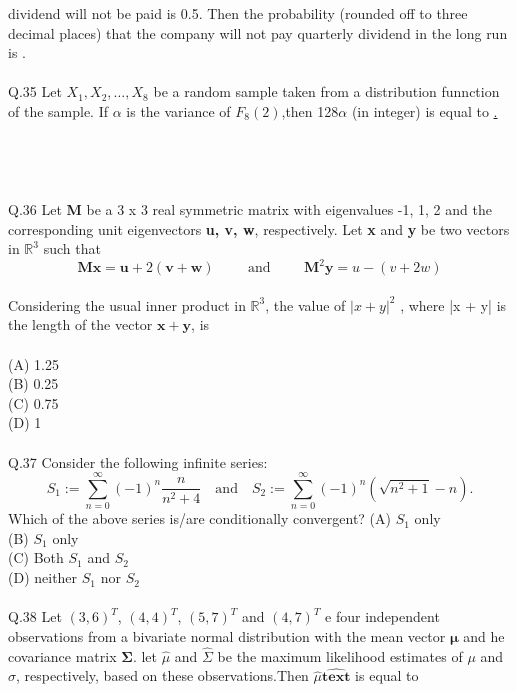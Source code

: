 \documentclass{book}[200pt]
\begin{document}
{dividend will not be paid is 0.5. Then the probability (rounded off to three
decimal places) that the company will not pay quarterly dividend in the long run is \underline{\hspace{2cm}}.\\
\\
Q.35 Let $X_1,X_2, \dots,X_8$ be a random sample taken from a distribution funnction of the sample. If $\alpha$ is the variance of $F_8(2)$,then 128$\alpha$ (in integer) is equal to \underline{\hspace{2cm}.}\\
\\
\pagebreak
\\
\\
\\
Q.36 Let \textbf{M} be a 3 x 3 real symmetric matrix with eigenvalues -1, 1, 2 and the corresponding unit eigenvectors \textbf{u, v, w}, respectively. Let \textbf{x} and \textbf{y} be two vectors in $\mathbb{R}^3$ such that
\[
\mathbf{M} \mathbf{x} = \mathbf{u} + 2(\mathbf{v} + \mathbf{w}) \hspace{1cm} \text{and} \hspace{1cm} \mathbf{M}^2\mathbf{y} = u -(v + 2w)
\]
\\ Considering the usual inner product in $\mathbb{R}^3$, the value  of ${|x + y|}^2$ , where |x + y| is the length of the vector $\mathbf{x + y}$, is \\
\\
(A) 1.25\\
(B) 0.25\\
(C) 0.75\\
(D) 1\\
\\
Q.37 Consider the following infinite series:
\[
S_1 := \sum_{n=0}^{\infty} (-1)^n \frac{n}{n^2 + 4} \quad \text{and} \quad 
S_2 := \sum_{n=0}^{\infty} (-1)^n \left(\sqrt{n^2 + 1} - n \right).
\]
Which of the above series is/are conditionally convergent?
(A) $S_1$ only\\
(B) $S_1$ only\\
(C) Both $S_1$ and $S_2$ \\
(D) neither $S_1$ nor $S_2$\\
\\
Q.38 Let ${(3,6)}^T$, ${(4,4)}^T$, ${(5,7)}^T$ and ${(4,7)}^T$ e four independent observations from a
bivariate normal distribution with the mean vector $\mathbf{\mu}$ and he covariance matrix $\mathbf{\Sigma}$. let $\hat{\mu}$ and $\hat{\Sigma}$ be the maximum likelihood estimates of $\mu$ and $\sigma$, respectively, based on these observations.Then $\hat{\mu}$$\hat{\mathbf{text}}$ is equal to  \\
$$}
\end{document}
